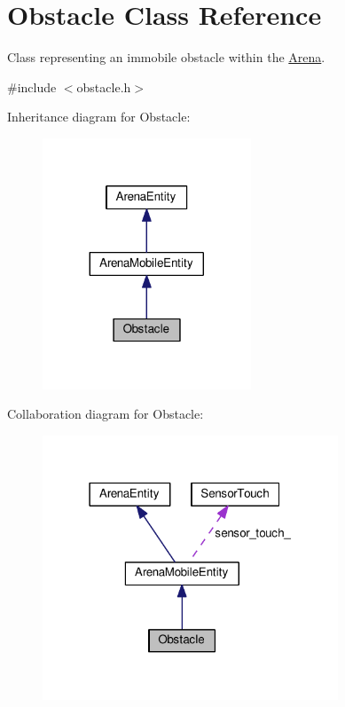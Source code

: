\hypertarget{classObstacle}{}\section{Obstacle Class Reference}
\label{classObstacle}


Class representing an immobile obstacle within the \hyperlink{classArena}{Arena}.  




{\ttfamily \#include $<$obstacle.\+h$>$}



Inheritance diagram for Obstacle\+:
\nopagebreak
\begin{figure}[H]
\begin{center}
\leavevmode
\includegraphics[width=176pt]{classObstacle__inherit__graph}
\end{center}
\end{figure}


Collaboration diagram for Obstacle\+:
\nopagebreak
\begin{figure}[H]
\begin{center}
\leavevmode
\includegraphics[width=250pt]{classObstacle__coll__graph}
\end{center}
\end{figure}
